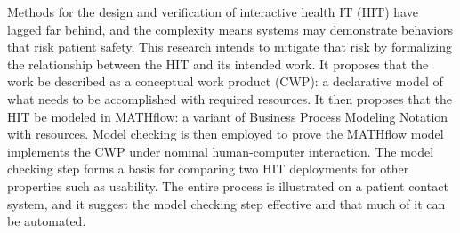 Methods for the design and verification of interactive health IT (HIT) have lagged far behind, and the complexity means systems may demonstrate behaviors that risk patient safety. This research intends to mitigate that risk by formalizing the relationship between the HIT and its intended work. It proposes that the work be described as a conceptual work product (CWP): a declarative model of what needs to be accomplished with required resources. It then proposes that the HIT be modeled in MATHflow: a variant of Business Process Modeling Notation with resources. Model checking is then employed to prove the MATHflow model implements the CWP under nominal human-computer interaction. The model checking step forms a basis for comparing two HIT deployments for other properties such as usability. The entire process is illustrated on a patient contact system, and it suggest the model checking step effective and that much of it can be automated.
